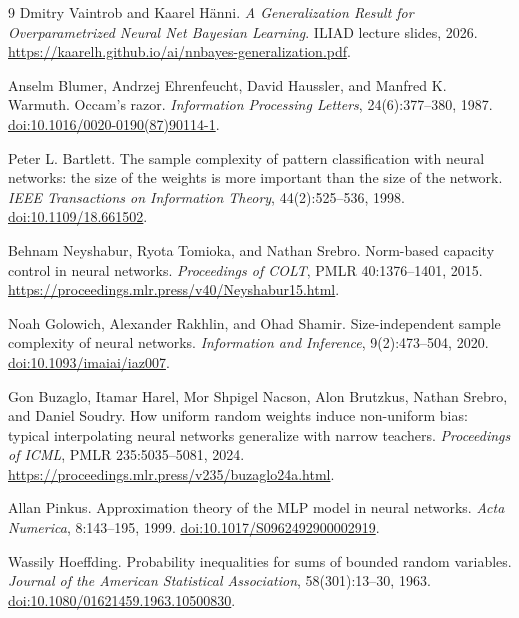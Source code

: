 \documentclass[11pt]{article}
\theoremstyle{definition}
\begin{document}
\appendix


\begin{thebibliography}{9}
Dmitry Vaintrob and Kaarel H\"anni.
\emph{A Generalization Result for Overparametrized Neural Net Bayesian Learning}.
ILIAD lecture slides, 2026.
\url{https://kaarelh.github.io/ai/nnbayes-generalization.pdf}.

Anselm Blumer, Andrzej Ehrenfeucht, David Haussler, and Manfred K. Warmuth.
Occam's razor. \emph{Information Processing Letters}, 24(6):377--380, 1987.
\href{https://doi.org/10.1016/0020-0190(87)90114-1}{doi:10.1016/0020-0190(87)90114-1}.

Peter L. Bartlett. The sample complexity of pattern classification with neural networks: the size of the weights is more important than the size of the network.
\emph{IEEE Transactions on Information Theory}, 44(2):525--536, 1998.
\href{https://doi.org/10.1109/18.661502}{doi:10.1109/18.661502}.

Behnam Neyshabur, Ryota Tomioka, and Nathan Srebro.
Norm-based capacity control in neural networks.
\emph{Proceedings of COLT}, PMLR 40:1376--1401, 2015.
\url{https://proceedings.mlr.press/v40/Neyshabur15.html}.

Noah Golowich, Alexander Rakhlin, and Ohad Shamir.
Size-independent sample complexity of neural networks.
\emph{Information and Inference}, 9(2):473--504, 2020.
\href{https://doi.org/10.1093/imaiai/iaz007}{doi:10.1093/imaiai/iaz007}.

Gon Buzaglo, Itamar Harel, Mor Shpigel Nacson, Alon Brutzkus, Nathan Srebro, and Daniel Soudry.
How uniform random weights induce non-uniform bias: typical interpolating neural networks generalize with narrow teachers.
\emph{Proceedings of ICML}, PMLR 235:5035--5081, 2024.
\url{https://proceedings.mlr.press/v235/buzaglo24a.html}.

Allan Pinkus. Approximation theory of the MLP model in neural networks.
\emph{Acta Numerica}, 8:143--195, 1999.
\href{https://doi.org/10.1017/S0962492900002919}{doi:10.1017/S0962492900002919}.

Wassily Hoeffding. Probability inequalities for sums of bounded random variables.
\emph{Journal of the American Statistical Association}, 58(301):13--30, 1963.
\href{https://doi.org/10.1080/01621459.1963.10500830}{doi:10.1080/01621459.1963.10500830}.
\end{thebibliography}
\end{document}
